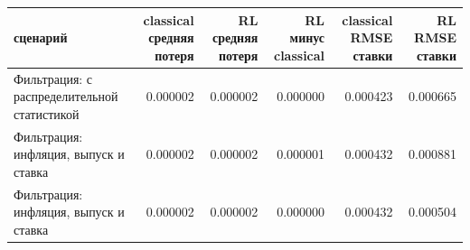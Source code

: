 \begin{tabular}{lrrrrr}
\toprule
сценарий & classical средняя потеря & RL средняя потеря & RL минус classical & classical RMSE ставки & RL RMSE ставки \\
\midrule
Фильтрация: с распределительной статистикой & 0.000002 & 0.000002 & 0.000000 & 0.000423 & 0.000665 \\
Фильтрация: инфляция, выпуск и ставка & 0.000002 & 0.000002 & 0.000001 & 0.000432 & 0.000881 \\
Фильтрация: инфляция, выпуск и ставка & 0.000002 & 0.000002 & 0.000000 & 0.000432 & 0.000504 \\
\bottomrule
\end{tabular}
